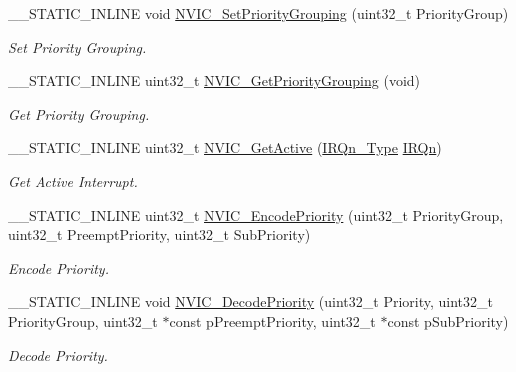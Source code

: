 \begin{DoxyCompactItemize}
\+\_\+\+\_\+\+S\+T\+A\+T\+I\+C\+\_\+\+I\+N\+L\+I\+NE void \hyperlink{group___c_m_s_i_s___core___n_v_i_c_functions_ga77cfbb35a9d8027e392034321bed6904}{N\+V\+I\+C\+\_\+\+Set\+Priority\+Grouping} (uint32\+\_\+t Priority\+Group)
\begin{DoxyCompactList}\small\item\em Set Priority Grouping. \end{DoxyCompactList}\item 
\+\_\+\+\_\+\+S\+T\+A\+T\+I\+C\+\_\+\+I\+N\+L\+I\+NE uint32\+\_\+t \hyperlink{group___c_m_s_i_s___core___n_v_i_c_functions_ga394f7ce2ca826c0da26284d17ac6524d}{N\+V\+I\+C\+\_\+\+Get\+Priority\+Grouping} (void)
\begin{DoxyCompactList}\small\item\em Get Priority Grouping. \end{DoxyCompactList}\item 
\+\_\+\+\_\+\+S\+T\+A\+T\+I\+C\+\_\+\+I\+N\+L\+I\+NE uint32\+\_\+t \hyperlink{group___c_m_s_i_s___core___n_v_i_c_functions_ga47a0f52794068d076c9147aa3cb8d8a6}{N\+V\+I\+C\+\_\+\+Get\+Active} (\hyperlink{group___configuration__section__for___c_m_s_i_s_gac3af4a32370fb28c4ade8bf2add80251}{I\+R\+Qn\+\_\+\+Type} \hyperlink{group___configuration__section__for___c_m_s_i_s_ga666eb0caeb12ec0e281415592ae89083}{I\+R\+Qn})
\begin{DoxyCompactList}\small\item\em Get Active Interrupt. \end{DoxyCompactList}\item 
\+\_\+\+\_\+\+S\+T\+A\+T\+I\+C\+\_\+\+I\+N\+L\+I\+NE uint32\+\_\+t \hyperlink{group___c_m_s_i_s___core___n_v_i_c_functions_gadb94ac5d892b376e4f3555ae0418ebac}{N\+V\+I\+C\+\_\+\+Encode\+Priority} (uint32\+\_\+t Priority\+Group, uint32\+\_\+t Preempt\+Priority, uint32\+\_\+t Sub\+Priority)
\begin{DoxyCompactList}\small\item\em Encode Priority. \end{DoxyCompactList}\item 
\+\_\+\+\_\+\+S\+T\+A\+T\+I\+C\+\_\+\+I\+N\+L\+I\+NE void \hyperlink{group___c_m_s_i_s___core___n_v_i_c_functions_ga3387607fd8a1a32cccd77d2ac672dd96}{N\+V\+I\+C\+\_\+\+Decode\+Priority} (uint32\+\_\+t Priority, uint32\+\_\+t Priority\+Group, uint32\+\_\+t $\ast$const p\+Preempt\+Priority, uint32\+\_\+t $\ast$const p\+Sub\+Priority)
\begin{DoxyCompactList}\small\item\em Decode Priority. \end{DoxyCompactList}\end{DoxyCompactItemize}


